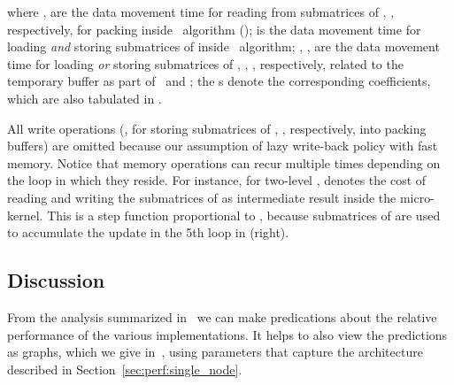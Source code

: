 where ,  are the data movement time for reading from submatrices of , , respectively, for packing
 inside \GOTO{} \gemm\ algorithm ();
 is the data movement time for loading \emph{and} storing submatrices of  inside \gemm\ algorithm;
, ,  are the data movement time for loading \emph{or} storing submatrices of , , , respectively, related to the temporary buffer as part of \XXXstrassen\ and \ABXstrassen{}; the s denote the corresponding coefficients, which are also tabulated in .



All write operations (,  for storing submatrices of , , respectively, into packing buffers) are omitted because our assumption of lazy write-back policy with fast memory. Notice that memory operations can recur multiple times depending on the loop in which they reside.
For instance, for two-level \strassen{},
\fromto{}
{}
denotes the cost of reading and writing the  submatrices of  as intermediate result inside the micro-kernel. This is a step function proportional to , because submatrices of  are used to accumulate the \rankk{} update in the 5th loop in (right).




\subsection{Discussion}
From the analysis summarized in~ we can 
make predications about the relative performance of the various implementations.  It helps to also view the predictions as graphs, 
which we give in~, using parameters that capture the architecture described in Section~\ref{sec:perf:single_node}.

